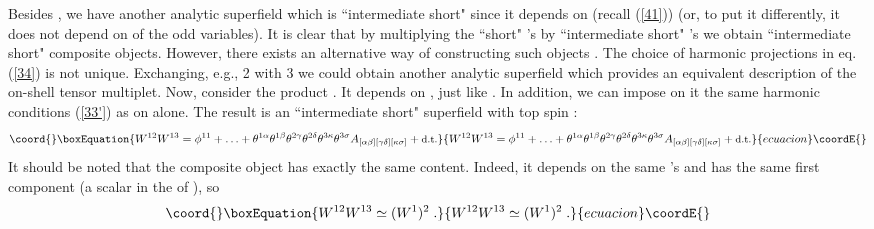 \documentclass[a4paper,12pt]{article}
\begin{document}
Besides \coordHE{}, we have another analytic superfield \coordHE{} which 
is ``intermediate short" since it depends on 
\coordHE{} (recall (\ref{41})) (or, to put it 
differently, it does not depend on \coordHE{} of the odd variables). It 
is clear that by multiplying the ``short" \coordHE{}'s by 
``intermediate short" \coordHE{}'s we obtain ``intermediate short" 
composite objects. However, there exists an alternative way of 
constructing such objects \cite{AFSZ,FS}. The choice of harmonic 
projections in eq. (\ref{34}) is not unique. Exchanging, e.g., 2 
with 3 we could obtain another analytic superfield 
\coordHE{} which provides an equivalent 
description of the on-shell tensor multiplet. Now, consider the 
product \coordHE{}. It 
depends on \coordHE{}, just like \coordHE{}. In addition, 
we can impose on it the same harmonic conditions (\ref{33'}) as on 
\coordHE{} alone. The result is an ``intermediate short" superfield 
with top spin \coordHE{}: 
\begin{equation}\coord{}\boxEquation{\label{new}
  W^{12}W^{13} = \phi^{11} + \ldots + \theta^{1\alpha}\theta^{1\beta}
\theta^{2\gamma}\theta^{2\delta} 
\theta^{3\kappa}\theta^{3\sigma}  
A_{[\alpha\beta][\gamma\delta][\kappa\sigma]} + \mbox{\small d.t.} 
}{W^{12}W^{13} = \phi^{11} + \ldots + \theta^{1\alpha}\theta^{1\beta}
\theta^{2\gamma}\theta^{2\delta} 
\theta^{3\kappa}\theta^{3\sigma}  
A_{[\alpha\beta][\gamma\delta][\kappa\sigma]} + \mbox{\small d.t.} 
}{ecuacion}\coordE{}\end{equation}
It should be noted that the composite object \coordHE{} has exactly 
the same content. Indeed, it depends on the same \myHighlight{$\theta$}\coordHE{}'s and 
has the same first component (a scalar in the \coordHE{} of 
\coordHE{}), so
\begin{equation}\coord{}\boxEquation{\label{equi}
  W^{12}W^{13} \simeq (W^1)^2\; .
}{W^{12}W^{13} \simeq (W^1)^2\; .
}{ecuacion}\coordE{}\end{equation}
\end{document}

